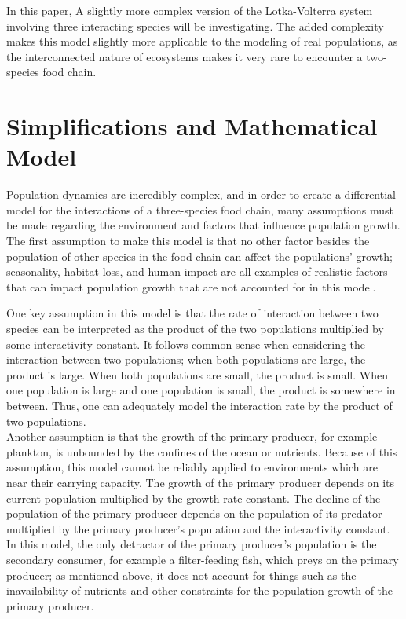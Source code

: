 \documentclass[11pt,oneside]{article}
\begin{document}
	
	In this paper, A slightly more complex version of the Lotka-Volterra system involving three interacting species will be investigating. The added complexity makes this model slightly more applicable to the modeling of real populations, as the interconnected nature of ecosystems makes it very rare to encounter a two-species food chain.
	
	
	\section{Simplifications and Mathematical Model}
	
	Population dynamics are incredibly complex, and in order to create a differential model for the interactions of a three-species food chain, many assumptions must be made regarding the environment and factors that influence population growth. The first assumption to make this model is that no other factor besides the population of other species in the food-chain can affect the populations' growth; seasonality, habitat loss, and human impact are all examples of realistic factors that can impact population growth that are not accounted for in this model.
	
	One key assumption in this model is that the rate of interaction between two species can be interpreted as the product of the two populations multiplied by some interactivity constant. It follows common sense when considering the interaction between two populations; when both populations are large, the product is large. When both populations are small, the product is small. When one population is large and one population is small, the product is somewhere in between. Thus, one can adequately model the interaction rate by the product of two populations.\\
	
	Another assumption is that the growth of the primary producer, for example plankton, is unbounded by the confines of the ocean or nutrients. Because of this assumption, this model cannot be reliably applied to environments which are near their carrying capacity. The growth of the primary producer depends on its current population multiplied by the growth rate constant. The decline of the population of the primary producer depends on the population of its predator multiplied by the primary producer's population and the interactivity constant. In this model, the only detractor of the primary producer's population is the secondary consumer, for example a filter-feeding fish, which preys on the primary producer; as mentioned above, it does not account for things such as the inavailability of nutrients and other constraints for the population growth of the primary producer.
	
\end{document}
